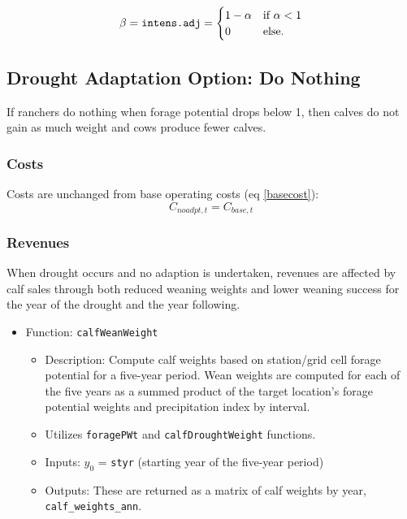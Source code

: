 \documentclass[11pt]{article}
\begin{document}
\begin{equation} \label{intens}
\beta = \verb!intens.adj!=
\begin{cases}
1-\alpha & \text{if}\ \alpha < 1 \\
0 & \text{else}.
\end{cases}
\end{equation}


\subsection{Drought Adaptation Option: Do Nothing}
If ranchers do nothing when forage potential drops below 1, then calves do not gain as much weight and cows produce fewer calves. 

\subsubsection{Costs}
Costs are unchanged from base operating costs (eq \ref{basecost}):
\begin{equation}
C_{noadpt,t} = C_{base,t}
\end{equation}


\subsubsection{Revenues}
When drought occurs and no adaption is undertaken, revenues are affected by calf sales through both reduced weaning weights and lower weaning success for the year of the drought and the year following.

\begin{itemize}
\item Function: \verb!calfWeanWeight!
	\begin{itemize}
	\item Description: Compute calf weights based on station/grid cell forage potential for a five-year period. Wean weights are computed for each of the five years as a summed product of the target location's forage potential weights and precipitation index by interval. 
	\item Utilizes \verb!foragePWt! and \verb!calfDroughtWeight! functions.
	\item Inputs: $y_0$ = \verb!styr! (starting year of the five-year period)
	\item Outputs: These are returned as a matrix of calf weights by year, \verb!calf_weights_ann!.
	\end{itemize}
\end{itemize}
\end{document}
